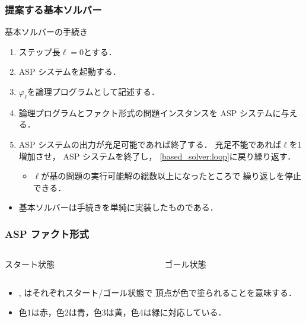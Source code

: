 \documentclass[dvipdfmx,11pt]{beamer}
\begin{document}
\begin{frame}\frametitle{提案する基本ソルバー}

  \begin{block}{基本ソルバーの手続き}
    \centering
    \begin{enumerate}
      \item ステップ長$\ell=0$とする．
      \item ASP システムを起動する．\label{based_solver:loop}
      \item $\varphi_{\ell}$を論理プログラムとして記述する．
      \item 論理プログラムとファクト形式の問題インスタンスを
            ASP システムに与える．
      \item ASP システムの出力が充足可能であれば終了する．
            充足不能であれば$\ell$を1増加させ，
            ASP システムを終了し，
            \ref{based_solver:loop}に戻り繰り返す．
            \begin{itemize}
              \item $\ell$が基の問題の実行可能解の総数以上になったところで
                    繰り返しを停止できる．
            \end{itemize}
    \end{enumerate}
  \end{block}

  \begin{itemize}
    \item 基本ソルバーは手続きを単純に実装したものである．
  \end{itemize}

\end{frame}

\begin{frame}\frametitle{ASP ファクト形式}
  
  \begin{columns}
    \begin{column}{0.45\textwidth}
      \centering
      
      スタート状態
    \end{column}
    \begin{column}{0.45\textwidth}
      \centering
      
      ゴール状態
    \end{column}
  \end{columns}

  \begin{block}{}
    
  \end{block}

  \begin{itemize}
    \item {}, はそれぞれスタート/ゴール状態で
          頂点が色で塗られることを意味する．
    \item 色1は赤，色2は青，色3は黄，色4は緑に対応している．
  \end{itemize}

\end{frame}
\end{document}
